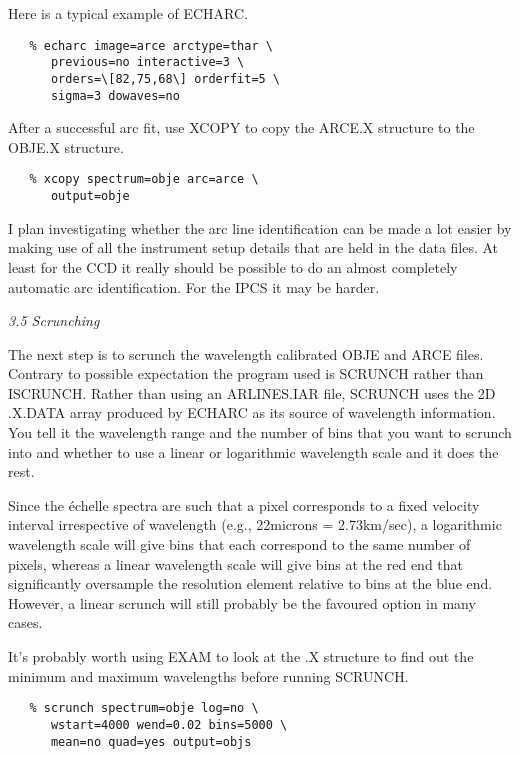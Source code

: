 Here is a typical example of ECHARC.

\begin{verbatim}
   % echarc image=arce arctype=thar \
      previous=no interactive=3 \
      orders=\[82,75,68\] orderfit=5 \
      sigma=3 dowaves=no
\end{verbatim}

After a successful arc fit, use XCOPY to copy the ARCE.X structure to the
OBJE.X structure.

\begin{verbatim}
   % xcopy spectrum=obje arc=arce \
      output=obje
\end{verbatim}

I plan investigating whether the arc line identification can be made a lot
easier by making use of all the instrument setup details that are held in
the data files. At least for the CCD it really should be possible to do
an almost completely automatic arc identification. For the IPCS it may be
harder.


\goodbreak
\vspace{12pt}
{\it 3.5 Scrunching}

The next step is to scrunch the wavelength calibrated OBJE and ARCE files.
Contrary to possible expectation the program used is SCRUNCH rather than
ISCRUNCH. Rather than using an ARLINES.IAR file, SCRUNCH uses the 2D .X.DATA
array produced by ECHARC as its source of wavelength information. You tell it
the wavelength range and the number of bins that you want to scrunch into and
whether to use a linear or logarithmic wavelength scale and it does the rest.

Since the \'echelle spectra are such that a pixel corresponds to a fixed
velocity interval irrespective of wavelength (e.g., 22microns =
2.73km/sec), a logarithmic wavelength scale will give bins that each
correspond to the same number of pixels, whereas a linear wavelength
scale will give bins at the red end that significantly oversample the
resolution element relative to bins at the blue end. However, a linear
scrunch will still probably be the favoured option in many cases.

It's probably worth using EXAM to look at the .X structure to find out the
minimum and maximum wavelengths before running SCRUNCH.

\begin{verbatim}
   % scrunch spectrum=obje log=no \
      wstart=4000 wend=0.02 bins=5000 \
      mean=no quad=yes output=objs
\end{verbatim}

